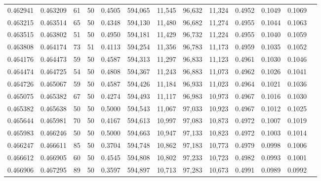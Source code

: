 \begin{tabular}{rrrrrrrrrrrrr}
0.462941 & 0.463209 &    61 &  50 &                                     0.4505 & 594,065 &  11,545 &  96,632 &  11,324 & 0.4952 & 0.1049 & 0.1069 \\
0.463215 & 0.463514 &    65 &  50 &                                     0.4348 & 594,130 &  11,480 &  96,682 &  11,274 & 0.4955 & 0.1044 & 0.1063 \\
0.463515 & 0.463802 &    51 &  50 &                                     0.4950 & 594,181 &  11,429 &  96,732 &  11,224 & 0.4955 & 0.1040 & 0.1059 \\
0.463808 & 0.464174 &    73 &  51 &                                     0.4113 & 594,254 &  11,356 &  96,783 &  11,173 & 0.4959 & 0.1035 & 0.1052 \\
0.464176 & 0.464473 &    59 &  50 &                                     0.4587 & 594,313 &  11,297 &  96,833 &  11,123 & 0.4961 & 0.1030 & 0.1046 \\
0.464474 & 0.464725 &    54 &  50 &                                     0.4808 & 594,367 &  11,243 &  96,883 &  11,073 & 0.4962 & 0.1026 & 0.1041 \\
0.464726 & 0.465067 &    59 &  50 &                                     0.4587 & 594,426 &  11,184 &  96,933 &  11,023 & 0.4964 & 0.1021 & 0.1036 \\
0.465075 & 0.465382 &    67 &  50 &                                     0.4274 & 594,493 &  11,117 &  96,983 &  10,973 & 0.4967 & 0.1016 & 0.1030 \\
0.465382 & 0.465638 &    50 &  50 &                                     0.5000 & 594,543 &  11,067 &  97,033 &  10,923 & 0.4967 & 0.1012 & 0.1025 \\
0.465644 & 0.465981 &    70 &  50 &                                     0.4167 & 594,613 &  10,997 &  97,083 &  10,873 & 0.4972 & 0.1007 & 0.1019 \\
0.465983 & 0.466246 &    50 &  50 &                                     0.5000 & 594,663 &  10,947 &  97,133 &  10,823 & 0.4972 & 0.1003 & 0.1014 \\
0.466247 & 0.466611 &    85 &  50 &                                     0.3704 & 594,748 &  10,862 &  97,183 &  10,773 & 0.4979 & 0.0998 & 0.1006 \\
0.466612 & 0.466905 &    60 &  50 &                                     0.4545 & 594,808 &  10,802 &  97,233 &  10,723 & 0.4982 & 0.0993 & 0.1001 \\
0.466906 & 0.467295 &    89 &  50 &                                     0.3597 & 594,897 &  10,713 &  97,283 &  10,673 & 0.4991 & 0.0989 & 0.0992 \\

\end{tabular}
